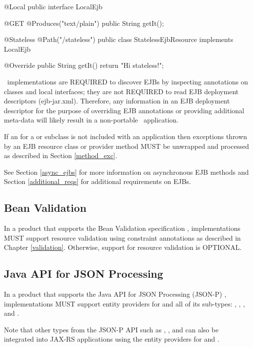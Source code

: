 \begin{listing}{1}
@Local
public interface LocalEjb {

    @GET
    @Produces("text/plain")
    public String getIt();
}

@Stateless
@Path("/stateless")
public class StatelessEjbResource implements LocalEjb {

    @Override
    public String getIt() {
        return "Hi stateless!";
    }
}
\end{listing}

\jaxrs\ implementations are REQUIRED to discover EJBs by inspecting annotations on classes and local interfaces; they are not REQUIRED to read EJB deployment descriptors (ejb-jar.xml). Therefore, any information in an EJB deployment descriptor for the purpose of overriding EJB annotations or providing additional meta-data will likely result in a non-portable \jaxrs\ application. 

If an  for a  or subclass is not included with an application then exceptions thrown by an EJB resource class or provider method MUST be unwrapped and processed as described in Section \ref{method_exc}. 

See Section \ref{async_ejbs} for more information on asynchronous EJB methods and Section \ref{additional_reqs} for additional requirements on EJBs.

\subsection{Bean Validation}
\label{bv_support}

In a product that supports the Bean Validation specification \cite{bv11}, implementations MUST support resource validation using constraint annotations as described in Chapter \ref{validation}. Otherwise, support for resource validation is OPTIONAL.

\subsection{Java API for JSON Processing}
\label{jsonp}

In a product that supports the Java API for JSON Processing (JSON-P) \cite{jsonp}, implementations MUST support entity providers for  and all of its sub-types: , , ,  and . 

Note that other types from the JSON-P API such as , ,  and  can also be integrated into JAX-RS applications using the entity providers for  and . 


